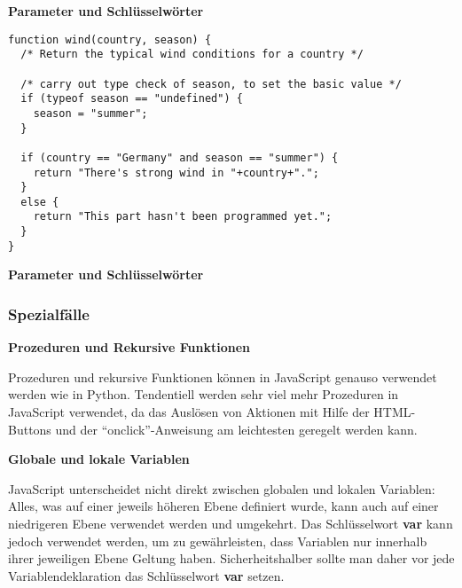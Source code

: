 \vspace{0.5cm}\par\noindent\textbf{Parameter und Schlüsselwörter}\vspace{0.5cm}

\begin{verbatim}
function wind(country, season) {
  /* Return the typical wind conditions for a country */

  /* carry out type check of season, to set the basic value */
  if (typeof season == "undefined") {
    season = "summer";
  }

  if (country == "Germany" and season == "summer") {
    return "There's strong wind in "+country+".";
  }
  else {
    return "This part hasn't been programmed yet.";
  }
}
\end{verbatim}




\vspace{0.5cm}\par\noindent\textbf{Parameter und Schlüsselwörter}\vspace{0.5cm}



\subsubsection{\texorpdfstring{{Spezialfälle}}{Spezialfälle}}

\vspace{0.5cm}\par\noindent\textbf{Prozeduren und Rekursive Funktionen}\vspace{0.5cm}

Prozeduren und rekursive Funktionen können in JavaScript genauso
verwendet werden wie in Python. Tendentiell werden sehr viel mehr
Prozeduren in JavaScript verwendet, da das Auslösen von Aktionen mit
Hilfe der HTML-Buttons und der ``onclick''-Anweisung am leichtesten
geregelt werden kann.




\vspace{0.5cm}\par\noindent\textbf{Globale und lokale Variablen}\vspace{0.5cm}

JavaScript unterscheidet nicht direkt zwischen globalen und lokalen
Variablen: Alles, was auf einer jeweils höheren Ebene definiert wurde,
kann auch auf einer niedrigeren Ebene verwendet werden und umgekehrt.
Das Schlüsselwort \textbf{var} kann jedoch verwendet werden, um zu
gewährleisten, dass Variablen nur innerhalb ihrer jeweiligen Ebene
Geltung haben. Sicherheitshalber sollte man daher vor jede
Variablendeklaration das Schlüsselwort \textbf{var} setzen.




